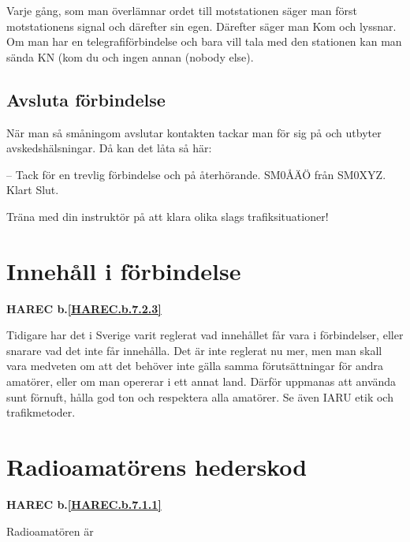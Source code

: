 Varje gång, som man överlämnar ordet till motstationen
säger man först motstationens signal och därefter sin egen. Därefter
säger man Kom och lyssnar. Om man har en telegrafiförbindelse och bara
vill tala med den stationen kan man sända KN (kom du och ingen annan
(nobody else).

\subsection{Avsluta förbindelse}

När man så småningom avslutar kontakten tackar man för sig på och
utbyter avskedshälsningar. Då kan det låta så här:

-- Tack för en trevlig förbindelse och på återhörande. SM0ÅÄÖ från
SM0XYZ. Klart Slut.

Träna med din instruktör på att klara olika slags trafiksituationer!

\section{Innehåll i förbindelse}
\textbf{HAREC
  b.\ref{HAREC.b.7.2.3}\label{myHAREC.b.7.2.3}
}

Tidigare har det i Sverige varit reglerat vad innehållet får vara i
förbindelser, eller snarare vad det inte får innehålla. Det är inte reglerat
nu mer, men man skall vara medveten om att det behöver inte gälla samma
förutsättningar för andra amatörer, eller om man opererar i ett annat land.
Därför uppmanas att använda sunt förnuft, hålla god ton och respektera alla
amatörer. Se även IARU etik och trafikmetoder.

\section{Radioamatörens hederskod}
\textbf{HAREC
  b.\ref{HAREC.b.7.1.1}\label{myHAREC.b.7.1.1}
}

Radioamatören är

